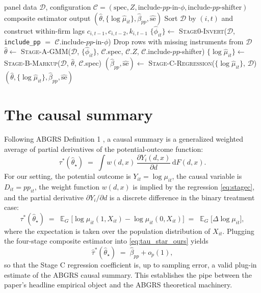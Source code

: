 \documentclass[11pt]{article}
\DeclareMathOperator{\E}{\mathbb{E}}
\begin{document}
\begin{algorithm}[htbp]
\caption{Composite estimator (wraps Stages 0--C)}\label{alg:composite}
\begin{algorithmic}[1]
\INPUT panel data $\mathcal{D}$, configuration $\mathcal{C} = (\text{spec}, Z, \text{include-}pp\text{-in-}\phi, \text{include-}pp\text{-shifter})$
\OUTPUT composite estimator output $(\hat\theta, \{\log\hat\mu_{it}\}, \hat\beta_{pp}, \hat{\mathrm{se}})$
\State Sort $\mathcal{D}$ by $(i,t)$ and construct within-firm lags $c_{i,t-1}, c_{i,t-2}, k_{i,t-1}$
\State $\{\hat\phi_{it}\} \gets$ \textsc{Stage0-Invert}($\mathcal{D}$, \texttt{include\_pp} $=$ $\mathcal{C}$.include-$pp$-in-$\phi$) 
\State Drop rows with missing instruments from $\mathcal{D}$
\State $\hat\theta \gets$ \textsc{Stage-A-GMM}($\mathcal{D}$, $\{\hat\phi_{it}\}$, $\mathcal{C}$.spec, $\mathcal{C}$.$Z$, $\mathcal{C}$.include-$pp$-shifter) 
\State $\{\log\hat\mu_{it}\} \gets$ \textsc{Stage-B-Markup}($\mathcal{D}$, $\hat\theta$, $\mathcal{C}$.spec) 
\State $(\hat\beta_{pp}, \hat{\mathrm{se}}) \gets$ \textsc{Stage-C-Regression}($\{\log\hat\mu_{it}\}$, $\mathcal{D}$) 
\State \Return $(\hat\theta, \{\log\hat\mu_{it}\}, \hat\beta_{pp}, \hat{\mathrm{se}})$
\end{algorithmic}
\end{algorithm}

\section{The causal summary}\label{sec:causal_summary}

Following ABGRS Definition 1 \citep[p.~1814]{ABGRS2025}, a causal summary is a generalized weighted average of partial derivatives of the potential-outcome function:
\begin{equation}\label{eq:causal_summary_abgrs}
\tau^*(\hat\theta_\star) \;=\; \int w(d,x)\, \frac{\partial Y_i(d,x)}{\partial d}\, \mathrm{d}F(d,x).
\end{equation}
For our setting, the potential outcome is $Y_{it} = \log\mu_{it}$, the causal variable is $D_{it} = pp_{it}$, the weight function $w(d,x)$ is implied by the regression \eqref{eq:stagec}, and the partial derivative $\partial Y_i/\partial d$ is a discrete difference in the binary treatment case:
\begin{equation}\label{eq:tau_star_ours}
\tau^*(\hat\theta_\star) \;=\; \E_G\bigl[\log\mu_{it}(1,X_{it}) - \log\mu_{it}(0,X_{it})\bigr] \;=\; \E_G\bigl[\Delta\log\mu_{it}\bigr],
\end{equation}
where the expectation is taken over the population distribution of $X_{it}$. Plugging the four-stage composite estimator into \eqref{eq:tau_star_ours} yields
\begin{equation}\label{eq:tau_star_plug}
\hat\tau^*(\hat\theta_\star) \;=\; \hat\beta_{pp} + o_p(1),
\end{equation}
so that the Stage C regression coefficient is, up to sampling error, a valid plug-in estimate of the ABGRS causal summary. This establishes the pipe between the paper's headline empirical object and the ABGRS theoretical machinery.
\end{document}
